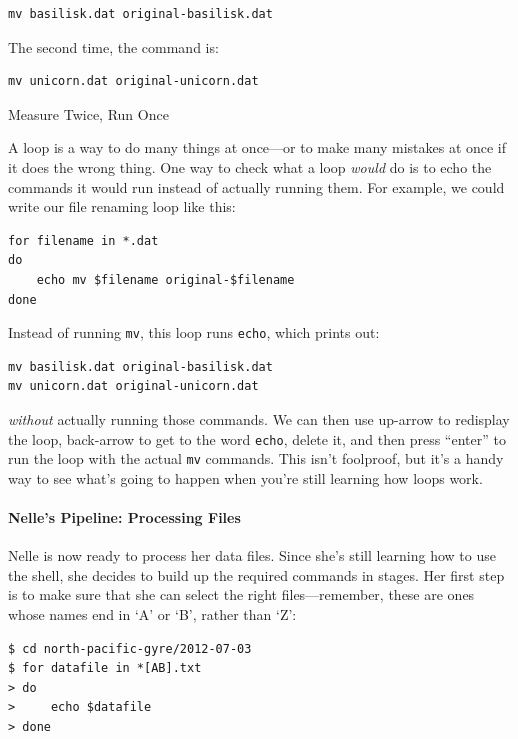 \documentclass{book}
\begin{document}
\begin{verbatim}
mv basilisk.dat original-basilisk.dat
\end{verbatim}

The second time, the command is:

\begin{verbatim}
mv unicorn.dat original-unicorn.dat
\end{verbatim}

\begin{swcbox}{Measure Twice, Run Once}

A loop is a way to do many things at once---or to make many mistakes at
once if it does the wrong thing. One way to check what a loop
\emph{would} do is to echo the commands it would run instead of actually
running them. For example, we could write our file renaming loop like
this:

\begin{verbatim}
for filename in *.dat
do
    echo mv $filename original-$filename
done
\end{verbatim}

Instead of running \texttt{mv}, this loop runs \texttt{echo}, which
prints out:

\begin{verbatim}
mv basilisk.dat original-basilisk.dat
mv unicorn.dat original-unicorn.dat
\end{verbatim}

\emph{without} actually running those commands. We can then use up-arrow
to redisplay the loop, back-arrow to get to the word \texttt{echo},
delete it, and then press ``enter'' to run the loop with the actual
\texttt{mv} commands. This isn't foolproof, but it's a handy way to see
what's going to happen when you're still learning how loops work.

\end{swcbox}

\mbox{}\paragraph{Nelle's Pipeline: Processing Files}

Nelle is now ready to process her data files. Since she's still learning
how to use the shell, she decides to build up the required commands in
stages. Her first step is to make sure that she can select the right
files---remember, these are ones whose names end in `A' or `B', rather
than `Z':

\begin{verbatim}
$ cd north-pacific-gyre/2012-07-03
$ for datafile in *[AB].txt
> do
>     echo $datafile
> done
\end{verbatim}
\end{document}
